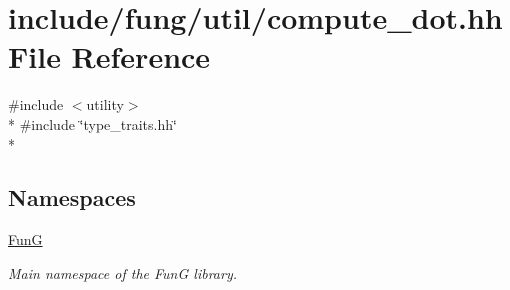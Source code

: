 \hypertarget{compute__dot_8hh}{}\section{include/fung/util/compute\+\_\+dot.hh File Reference}
\label{compute__dot_8hh}
{\ttfamily \#include $<$utility$>$}\\*
{\ttfamily \#include \char`\"{}type\+\_\+traits.\+hh\char`\"{}}\\*
\subsection*{Namespaces}
\begin{DoxyCompactItemize}
\item 
 \hyperlink{namespaceFunG}{FunG}
\begin{DoxyCompactList}\small\item\em Main namespace of the FunG library. \end{DoxyCompactList}\end{DoxyCompactItemize}
